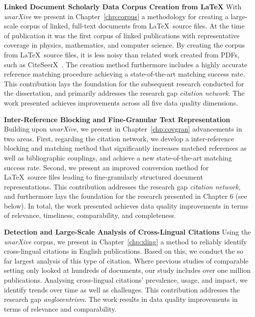 \textbf{Linked Document Scholarly Data Corpus Creation from \LaTeX} With \emph{unarXive} we present in Chapter~\ref{chp:corpus} a methodology for creating a large-scale corpus of linked, full-text documents from \LaTeX\ source files. At the time of publication it was the first corpus of linked publications with representative coverage in physics, mathematics, and computer science. By creating the corpus from \LaTeX\ source files, it is less noisy than related work created from PDFs, such as CiteSeerX~\cite{Wu2015}. The creation method furthermore includes a highly accurate reference matching procedure achieving a state-of-the-art matching success rate.
This contribution lays the foundation for the subsequent research conducted for the dissertation, and primarily addresses the research gap \emph{citation network}.
The work presented achieves improvements across all five data quality dimensions.

\textbf{Inter-Reference Blocking and Fine-Granular Text Representation} Building upon \emph{unarXive}, we present in Chapter~\ref{chp:covgran} advancements in two areas. First, regarding the citation network, we develop a inter-reference blocking and matching method that significantly increases matched references as well as bibliographic couplings, and achieve a new state-of-the-art matching success rate. Second, we present an improved conversion method for \LaTeX\ source files leading to fine-granularly structured document representations. %
This contribution addresses the research gap \emph{citation network}, and furthermore lays the foundation for the research presented in Chapter 6 (see below).
In total, the work presented achieves data quality improvements in terms of relevance, timeliness, comparability, and completeness.

\textbf{Detection and Large-Scale Analysis of Cross-Lingual Citations} Using the \emph{unarXive} corpus, we present in Chapter~\ref{chp:xling} a method to reliably identify cross-lingual citations in English publications. Based on this, we conduct the so far largest analysis of this type of citation. Where previous studies of comparable setting only looked at hundreds of documents, our study includes over one million publications. Analysing cross-lingual citations' prevalence, usage, and impact, we identify trends over time as well as challenges.
This contribution addresses the research gap \emph{anglocentrism}.
The work results in data quality improvements in %
terms of 
relevance and comparability.

